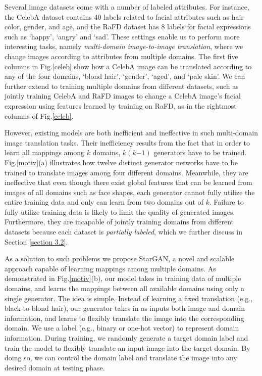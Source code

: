 Several image datasets come with a number of labeled attributes. For instance, the CelebA\cite{liu2015faceattributes} dataset contains 40 labels related to facial attributes such as hair color, gender, and age, and the RaFD \cite{langner2010presentation} dataset has 8 labels for facial expressions such as `happy', `angry' and `sad'. These settings enable us to perform more interesting tasks, namely \textit{multi-domain image-to-image translation}, where we change images according to attributes from multiple domains. The first five columns in Fig.\thinspace\ref{celeb} show how a CelebA image can be translated according to any of the four domains, `blond hair', `gender', `aged', and `pale skin'. We can further extend to training multiple domains from different datasets, such as jointly training CelebA and RaFD images to change a CelebA image's facial expression using features learned by training on RaFD, as in the rightmost columns of Fig.\thinspace\ref{celeb}. 

However, existing models are both inefficient and ineffective in such multi-domain image translation tasks. Their inefficiency results from the fact that in order to learn all mappings among $k$ domains, $k(k\mathbb{-}1)$ generators have to be trained. Fig.\thinspace\ref{motiv}\thinspace(a) illustrates how twelve distinct generator networks have to be trained to translate images among four different domains. Meanwhile, they are ineffective that even though there exist global features that can be learned from images of all domains such as face shapes, each generator cannot fully utilize the entire training data and only can learn from two domains out of $k$. Failure to fully utilize training data is likely to limit the quality of generated images. Furthermore, they are incapable of jointly training domains from different datasets because each dataset is \textit{partially labeled}, which we further discuss in Section \ref{section 3.2}.

As a solution to such problems we propose StarGAN, a novel and scalable approach capable of learning mappings among multiple domains. As demonstrated in Fig.\thinspace\ref{motiv}\thinspace(b), our model takes in training data of multiple domains, and learns the mappings between all available domains using only a single generator. The idea is simple. Instead of learning a fixed translation (e.g., black-to-blond hair), our generator takes in as inputs both image and domain information, and learns to flexibly translate the image into the corresponding domain. We use a label (e.g., binary or one-hot vector) to represent domain information. During training, we randomly generate a target domain label and train the model to flexibly translate an input image into the target domain. By doing so, we can control the domain label and translate the image into any desired domain at testing phase. 

